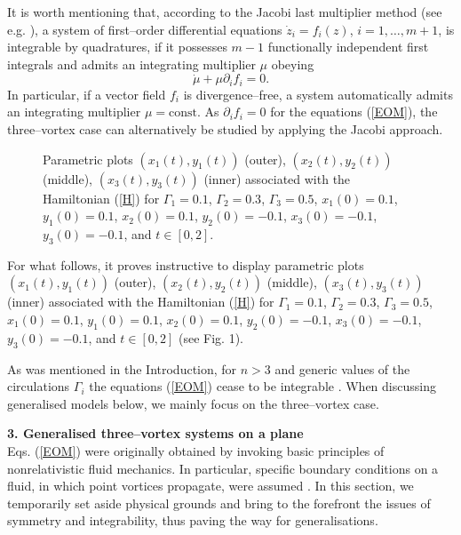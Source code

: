 \documentclass[12pt]{article}
\def\be{\begin{equation}}
\def\ee{\end{equation}}
\begin{document}
It is worth mentioning that, according to the Jacobi last multiplier method (see e.g. \cite{W}), a system of first--order differential equations ${\dot z}_i=f_i (z)$, $i=1,\dots,m+1$, is integrable by quadratures, if it possesses $m-1$ functionally independent first integrals and admits an integrating multiplier $\mu$ obeying
\be
\dot\mu+\mu \partial_i f_i=0.
\ee
In particular, if a vector field $f_i$ is divergence--free, a system automatically admits an integrating multiplier $\mu=\mbox{const}$. As $\partial_i f_i=0$ for the equations (\ref{EOM}), the three--vortex case can alternatively be studied by applying the Jacobi approach.

\begin{figure}[ht]
\begin{center}
\vskip-4mm
\caption{\small Parametric plots $(x_1 (t),y_1 (t))$ (outer), $(x_2 (t),y_2 (t))$ (middle), $(x_3 (t),y_3 (t))$ (inner) associated with the Hamiltonian (\ref{H}) for $\Gamma_1=0.1$, $\Gamma_2=0.3$, $\Gamma_3=0.5$, $x_1(0)=0.1$, $y_1 (0)=0.1$, $x_2 (0)=0.1$, $y_2 (0)=-0.1$, $x_3 (0)=-0.1$, $y_3 (0)=-0.1$, and $t \in [0,2]$.}
\label{fig3}
\end{center}
\end{figure}

For what follows, it proves instructive to display parametric plots $(x_1 (t),y_1 (t))$ (outer), $(x_2 (t),y_2 (t))$ (middle), $(x_3 (t),y_3 (t))$ (inner) associated with the Hamiltonian (\ref{H}) for $\Gamma_1=0.1$, $\Gamma_2=0.3$, $\Gamma_3=0.5$, $x_1(0)=0.1$, $y_1 (0)=0.1$, $x_2 (0)=0.1$, $y_2 (0)=-0.1$, $x_3 (0)=-0.1$, $y_3 (0)=-0.1$, and $t \in [0,2]$ (see Fig. 1).

As was mentioned in the Introduction, for $n>3$ and generic values of the circulations $\Gamma_i$ the equations (\ref{EOM}) cease to be integrable \cite{Z}. When discussing generalised models below, we mainly focus on the three--vortex case.
\vspace{0.5cm}

\noindent
{\bf 3.  Generalised three--vortex systems on a plane}\\

\noindent
Eqs. (\ref{EOM}) were originally obtained by invoking basic principles of nonrelativistic fluid mechanics. In particular, specific boundary conditions on a fluid, in which point vortices propagate, were assumed \cite{GK}. In this section, we temporarily set aside physical grounds and bring to the forefront the issues of symmetry and integrability, thus paving the way for generalisations.
\end{document}
